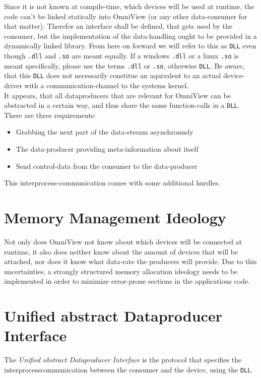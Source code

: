 \documentclass[]{scrreprt}
\begin{document}
Since it is not known at compile-time, which devices will be used at runtime, the code can't be linked statically into OmniView (or any other data-\gls{consumer} for that matter). 
Therefor an interface shall be defined, that gets used by the consumer, but the implementation of the data-handling ought to be provided in a dynamically linked library. 
From here on forward we will refer to this as \lstinline|DLL| even though \lstinline|.dll| and \lstinline|.so| are meant equally. 
If a windows \lstinline|.dll| or a linux \lstinline|.so| is meant specifically, please use the terms \lstinline|.dll| or \lstinline|.so|, otherwise \lstinline|DLL|. 
Be aware, that this \lstinline|DLL| does not necessarily constitue an aquivalent to an actual device-driver with a communication-channel to the systems kernel.
\\
It appears, that all dataproducers that are relevant for OmniView can be abstracted in a certain way, and thus share the same function-calls in a \lstinline|DLL|.
There are three requirements:
\begin{itemize}
    \item Grabbing the next part of the data-stream asynchronusly
    \item The data-producer providing meta-information about itself 
    \item Send control-data from the consumer to the data-producer
\end{itemize}
This interprocess-communication comes with some additional hurdles.

\section{Memory Management Ideology}
Not only does OmniView not know about which devices will be connected at runtime, it also does neither know about the amount of devices that will be attached, nor does it know what data-rate the producers will provide.
Due to this uncertainties, a strongly structured memory allocation ideology needs to be implemented in order to minimize error-prone sections in the applications code.


\section[UaDI]{Unified abstract Data\-producer Interface}
The \textit{Unified abstract Data\-producer Interface} is the protocol that specifies the interprocess\-communication between the con\-sumer and the device, using the \lstinline|DLL|. 
\end{document}
